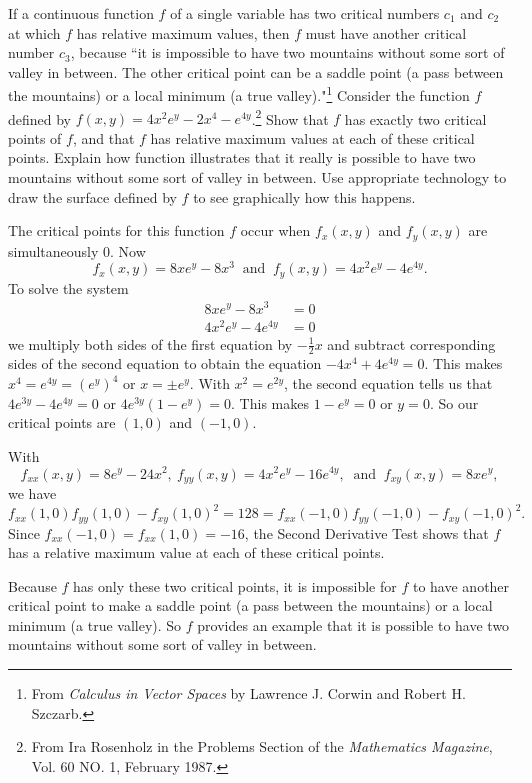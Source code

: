\begin{exercises}
\begin{exerciseSolution}
\ea
\end{exerciseSolution}

\item If a continuous function $f$ of a single variable has two critical numbers $c_1$ and $c_2$ at which $f$ has relative maximum values, then $f$ must have another critical number $c_3$, because ``it is impossible to have two mountains without some sort of valley in between. The other critical point can be a saddle point (a pass between the mountains) or a local minimum (a true valley)."\footnote{From \emph{Calculus in Vector Spaces} by Lawrence J. Corwin and Robert H. Szczarb.} Consider the function $f$ defined by $f(x,y) = 4x^2e^y -2x^4 -e^{4y}$.\footnote{From Ira Rosenholz in the Problems Section of the \emph{Mathematics Magazine}, Vol. 60 NO. 1, February 1987.}  Show that $f$ has exactly two critical points of $f$, and that $f$ has relative maximum values at each of these critical points. Explain how function illustrates that it really is possible to have two mountains without some sort of valley in between. Use appropriate technology to draw the surface defined by $f$ to see graphically how this happens.  


\begin{exerciseSolution}
The critical points for this function $f$ occur when $f_x(x,y)$ and $f_y(x,y)$ are simultaneously 0. Now
\[f_x(x,y) = 8xe^y - 8x^3 \ \text{ and } \ f_y(x,y) = 4x^2e^y-4e^{4y}.\]
To solve the system
\begin{align*}
8xe^y - 8x^3 &= 0 \\
4x^2e^y-4e^{4y} &= 0
\end{align*}
we multiply both sides of the first equation by $-\frac{1}{2}x$ and subtract corresponding sides of the second equation to obtain the equation $-4x^4+4e^{4y} = 0$. This makes $x^4 = e^{4y} = (e^y)^4$ or $x = \pm e^y$. With $x^2 = e^{2y}$, the second equation tells us that $4e^{3y} - 4e^{4y} = 0$ or $4e^{3y}(1-e^y) = 0$. This makes $1-e^y=0$ or $y=0$. So our critical points are $(1,0)$ and $(-1,0)$. 

With 
\[f_{xx}(x,y) = 8e^y-24x^2, \ f_{yy}(x,y) = 4x^2e^y-16e^{4y}, \ \text{ and } \ f_{xy}(x,y) = 8xe^y,\]
we have 
\[f_{xx}(1,0)f_{yy}(1,0) - f_{xy}(1,0)^2 = 128 = f_{xx}(-1,0)f_{yy}(-1,0) - f_{xy}(-1,0)^2.\]
Since $f_{xx}(-1,0) = f_{xx}(1,0) = -16$, the Second Derivative Test shows that $f$ has a relative maximum value at each of these critical points.

Because $f$ has only these two critical points, it is impossible for $f$ to have another critical point to make a saddle point (a pass between the mountains) or a local minimum (a true valley). So $f$ provides an example that it is possible to have two mountains without some sort of valley in between.
\end{exerciseSolution}



\end{exercises}
